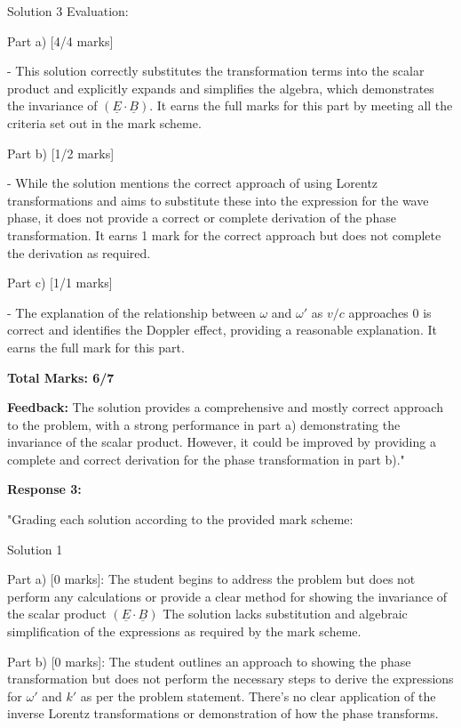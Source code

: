 \documentclass[a4paper,11pt]{article}
\begin{document}
Solution 3 Evaluation:

Part a) [4/4 marks]

- This solution correctly substitutes the transformation terms into the scalar product and explicitly expands and simplifies the algebra, which demonstrates the invariance of \( (\underline{E} \cdot \underline{B}) \). It earns the full marks for this part by meeting all the criteria set out in the mark scheme.

Part b) [1/2 marks]

- While the solution mentions the correct approach of using Lorentz transformations and aims to substitute these into the expression for the wave phase, it does not provide a correct or complete derivation of the phase transformation. It earns 1 mark for the correct approach but does not complete the derivation as required.

Part c) [1/1 marks]

- The explanation of the relationship between \( \omega \) and \( \omega' \) as \( v/c \) approaches \( 0 \) is correct and identifies the Doppler effect, providing a reasonable explanation. It earns the full mark for this part.

\textbf{Total Marks: 6/7}

\textbf{Feedback:} The solution provides a comprehensive and mostly correct approach to the problem, with a strong performance in part a) demonstrating the invariance of the scalar product. However, it could be improved by providing a complete and correct derivation for the phase transformation in part b)."

\textbf{Response 3:}

"Grading each solution according to the provided mark scheme:

Solution 1

Part a) [0 marks]: The student begins to address the problem but does not perform any calculations or provide a clear method for showing the invariance of the scalar product \((\underline{E} \cdot \underline{B})\) The solution lacks substitution and algebraic simplification of the expressions as required by the mark scheme.

Part b) [0 marks]: The student outlines an approach to showing the phase transformation but does not perform the necessary steps to derive the expressions for \(\omega'\) and \(k'\) as per the problem statement. There's no clear application of the inverse Lorentz transformations or demonstration of how the phase transforms.
\end{document}
